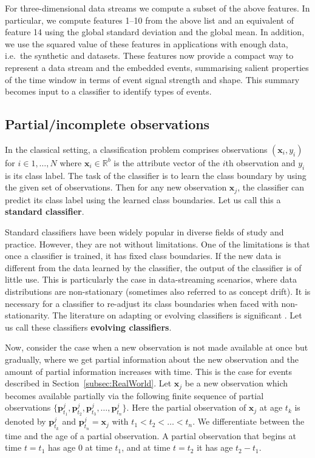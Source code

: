 \documentclass[a4paper,11pt]{article}
\begin{document}
For three-dimensional data streams we compute a subset of the above features. In particular, we compute features 1--10 from the above list and an equivalent of feature 14 using the global standard deviation and the global mean. In addition, we use the squared value of these features in applications with enough data, i.e.\ the synthetic and  datasets. These features now provide a compact way to represent a data stream and the embedded events, summarising salient properties of the time window in terms of event signal strength and shape. This summary becomes input to a classifier to identify types of events.

\subsection{Partial/incomplete observations}\label{sec:Notation}

In the classical setting, a classification problem comprises observations $(\bm{x}_i, y_i)$ for $i \in 1,\dots, N$ where $\bm{x}_i \in \mathbb{R}^b$ is the attribute vector of the $i$th observation and $y_i$ is its class label. The task of the classifier is to learn the class boundary by using the given set of observations. Then for any new observation $\bm{x}_j$, the classifier can predict its class label using the learned class boundaries. Let us call this a \textbf{standard classifier}.

Standard classifiers have been widely popular in diverse fields of study and practice. However, they are not without limitations. One of the limitations is that once a classifier is trained, it has fixed class boundaries. If the new data is different from the data learned by the classifier, the output of the classifier is of little use. This is particularly the case in data-streaming scenarios, where data distributions are non-stationary (sometimes also referred to as concept drift). It is necessary for a classifier to re-adjust its class boundaries when faced with non-stationarity. The literature on adapting or evolving classifiers is significant \citep{ditzler2015learning}. Let us call these classifiers \textbf{evolving classifiers}.

Now, consider the case when a new observation is not made available at once but gradually, where we get partial information about the new observation and the amount of partial information increases with time. This is the case for events described in Section~\ref{subsec:RealWorld}. Let $\bm{x}_j$ be a new observation which becomes available partially via the following finite sequence of partial observations $\{\bm{p}^j_{t_1},\bm{p}^j_{t_2}, \bm{p}^j_{t_3}, \dots, \bm{p}^j_{t_n}\}$. Here the partial observation of $\bm{x}_j$ at age $t_k$ is denoted by $\bm{p}^j_{t_k}$ and $\bm{p}^j_{t_n} = \bm{x}_j$ with $t_1 < t_2 < \dots < t_n$. We differentiate between the time and the age of a partial observation. A partial observation that begins at time $t =t_1$ has age $0$ at time $t_1$, and at time $t = t_2$ it has age $t_2 - t_1$.
\end{document}
